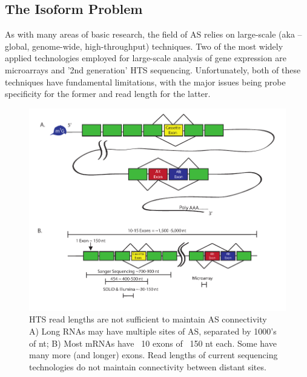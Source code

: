 \subsection{The Isoform Problem}

As with many areas of basic research, the field of AS relies on large-scale (aka – global, genome-wide, high-throughput) techniques. Two of the most widely applied technologies employed for large-scale analysis of gene expression are microarrays and '2nd generation' HTS sequencing. Unfortunately, both of these techniques have fundamental limitations, with the major issues being probe specificity for the former and read length for the latter.

\begin{figure}[htbp]
	\centering 
	\includegraphics{Figures/Chapter1/SeqLengths_and_Connectivity.pdf}
	\caption[HTS read lengths are not sufficient to maintain AS connectivity]
	{
		HTS read lengths are not sufficient to maintain AS connectivity\\[0.25cm]
		A) Long RNAs may have multiple sites of AS, separated by 1000's of nt; B) Most mRNAs have ~10 exons of ~150 nt each. Some have many more (and longer) exons. Read lengths of current sequencing technologies do not maintain connectivity between distant sites.
	}
	\label{fig:NoConnectivityInHTSMethods}
\end{figure}


